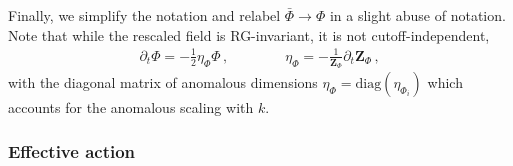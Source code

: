 \documentclass[reprint,twocolumn,superscriptaddress,preprintnumbers,amsmath,amssymb,aps,prd,floatfix]{revtex4-2}
\begin{document}
Finally, we simplify the notation and relabel $\bar\Phi\to\Phi$ in a slight abuse of notation. Note that while the rescaled field is RG-invariant, it is not cutoff-independent, 
%
\begin{align}
    \partial_{t} \Phi=-\frac{1}{2}\eta_{\Phi}\Phi\,,\qquad \qquad \eta_{\Phi}=-\frac{1}{\boldsymbol{Z}_{\Phi}}\partial_{t}\boldsymbol{Z}_{\Phi}\,, 
   \label{eq:etaPhi}
\end{align}
%
with the diagonal matrix of anomalous dimensions $\eta_{\Phi}=\textrm{diag}(\eta_{\Phi_i})$ which accounts for the anomalous scaling with $k$. 


\subsubsection{Effective action}
\label{app:EffAct}
\end{document}
